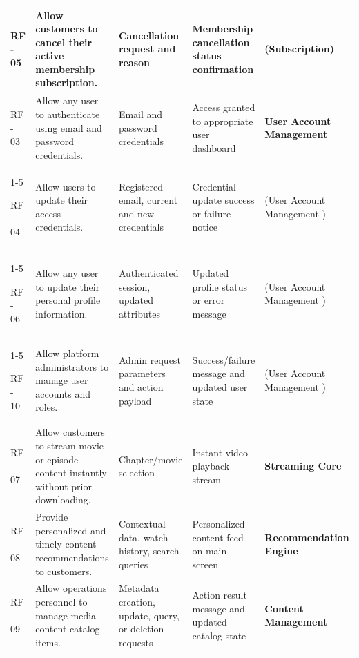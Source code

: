 \documentclass{article}
\begin{document}
\begin{longtable}{|p{1.3cm}|p{5.2cm}|p{3.2cm}|p{3.2cm}|p{3.0cm}|}
\rowcolor{pastelSub}
RF - 05 &
Allow customers to cancel their active membership subscription. &
Cancellation request and reason &
Membership cancellation status confirmation &
(Subscription) \\
\hline



\rowcolor{pastelIAM}
RF - 03 &
Allow any user to authenticate using email and password credentials. &
Email and password credentials &
Access granted to appropriate user dashboard &
\textbf{User Account Management } \\
\cline{1-5}

\rowcolor{pastelIAM}
RF - 04 &
Allow users to update their access credentials. &
Registered email, current and new credentials &
Credential update success or failure notice &
(User Account Management ) \\
\cline{1-5}

\rowcolor{pastelIAM}
RF - 06 &
Allow any user to update their personal profile information. &
Authenticated session, updated attributes &
Updated profile status or error message &
(User Account Management ) \\
\cline{1-5}

\rowcolor{pastelIAM}
RF - 10 &
Allow platform administrators to manage user accounts and roles. &
Admin request parameters and action payload &
Success/failure message and updated user state &
(User Account Management ) \\
\hline



\rowcolor{pastelStream}
RF - 07 &
Allow customers to stream movie or episode content instantly without prior downloading. &
Chapter/movie selection &
Instant video playback stream &
\textbf{Streaming Core} \\
\hline



\rowcolor{pastelRec}
RF - 08 &
Provide personalized and timely content recommendations to customers. &
Contextual data, watch history, search queries &
Personalized content feed on main screen &
\textbf{Recommendation Engine} \\
\hline



\rowcolor{pastelContent}
RF - 09 &
Allow operations personnel to manage media content catalog items. &
Metadata creation, update, query, or deletion requests &
Action result message and updated catalog state &
\textbf{Content Management} \\
\hline



\end{longtable}
\end{document}
